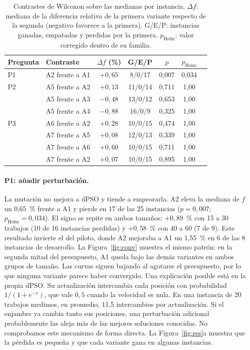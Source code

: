 \documentclass[10pt,a4paper]{article}
\newcommand{\dc}{{,}}%
\begin{document}
\begin{table}[htb]
\centering\small
\caption{Contrastes de Wilcoxon sobre las medianas por instancia. $\Delta f$: mediana de la
diferencia relativa de la primera variante respecto de la segunda (negativo favorece a la
primera). G/E/P: instancias ganadas, empatadas y perdidas por la primera. $p_{\text{Holm}}$:
valor corregido dentro de su familia.}
\label{tab:con}
\begin{tabular}{@{}llccccc@{}}
\toprule
Pregunta & Contraste & $\Delta f$ (\%) & G/E/P & $p$ & $p_{\text{Holm}}$ \\
\midrule
P1 & A2 frente a A1 & $+0{,}65$ & 8/0/17  & 0,007 & 0,034 \\
P2 & A5 frente a A2 & $+0{,}13$ & 11/0/14 & 0,711 & 1,00 \\
   & A5 frente a A3 & $-0{,}48$ & 13/0/12 & 0,653 & 1,00 \\
   & A5 frente a A4 & $-0{,}88$ & 16/0/9  & 0,325 & 1,00 \\
P3 & A6 frente a A2 & $+0{,}28$ & 10/0/15 & 0,474 & 1,00 \\
   & A7 frente a A5 & $+0{,}08$ & 12/0/13 & 0,339 & 1,00 \\
   & A7 frente a A6 & $+0{,}60$ & 10/0/15 & 0,711 & 1,00 \\
   & A7 frente a A2 & $+0{,}07$ & 10/0/15 & 0,895 & 1,00 \\
\bottomrule
\end{tabular}
\end{table}

\paragraph{P1: añadir perturbación.}
La mutación no mejora a dPSO y tiende a empeorarla. A2 eleva la mediana de $f$ un 0,65~\%
frente a A1 y pierde en 17 de las 25 instancias ($p=0\dc007$; $p_{\text{Holm}}=0\dc034$). El
signo se repite en ambos tamaños: $+0{,}89$~\% con 15 a 30 trabajos (10 de 16 instancias
perdidas) y $+0{,}58$~\% con 40 a 60 (7 de 9). Este resultado invierte el del piloto, donde A2
mejoraba a A1 un 1,55~\% en 6 de las 8 instancias de desarrollo. La Figura~\ref{fig:conv}
muestra el mismo patrón: en la segunda mitad del presupuesto, A1 queda bajo las demás variantes
en ambos grupos de tamaño. Las curvas siguen bajando al agotarse el presupuesto, por lo que
ninguna variante parece haber convergido. Una explicación posible está en la propia dPSO. Su
actualización intercambia cada posición con probabilidad $1/(1+e^{-v})$, que vale $0\dc5$ cuando
la velocidad es nula. En una instancia de 20 trabajos medimos, en promedio, 11,5 intercambios por
actualización. Si el enjambre ya cambia tanto sus posiciones, una perturbación adicional
probablemente las aleja más de las mejores soluciones conocidas. No comprobamos este mecanismo
de forma directa. La Figura~\ref{fig:res}a muestra que la pérdida es pequeña y que cada variante
gana en algunas instancias.
\end{document}
